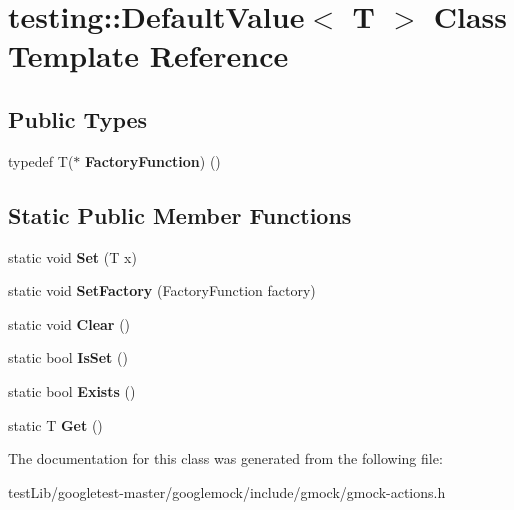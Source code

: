 \hypertarget{classtesting_1_1DefaultValue}{}\section{testing\+:\+:Default\+Value$<$ T $>$ Class Template Reference}
\label{classtesting_1_1DefaultValue}
\subsection*{Public Types}
\begin{DoxyCompactItemize}
\item 
\mbox{\label{classtesting_1_1DefaultValue_a5763a68d75e0a4c97fcaff708e2df803}} 
typedef T($\ast$ {\bfseries Factory\+Function}) ()
\end{DoxyCompactItemize}
\subsection*{Static Public Member Functions}
\begin{DoxyCompactItemize}
\item 
\mbox{\label{classtesting_1_1DefaultValue_a5698814be364b9ac26e72ad37d6ff14e}} 
static void {\bfseries Set} (T x)
\item 
\mbox{\label{classtesting_1_1DefaultValue_af012445ff5b194940c1427529707cb91}} 
static void {\bfseries Set\+Factory} (Factory\+Function factory)
\item 
\mbox{\label{classtesting_1_1DefaultValue_a8163037b60311177cb211f070c512ee3}} 
static void {\bfseries Clear} ()
\item 
\mbox{\label{classtesting_1_1DefaultValue_ad49febe2c944cbbd06451ba7d0366ca1}} 
static bool {\bfseries Is\+Set} ()
\item 
\mbox{\label{classtesting_1_1DefaultValue_aec1ff9b510af7dbb86c837fd2409fd70}} 
static bool {\bfseries Exists} ()
\item 
\mbox{\label{classtesting_1_1DefaultValue_a4dc6dfee4cbc9cdb36f5c9cde5cf2b83}} 
static T {\bfseries Get} ()
\end{DoxyCompactItemize}


The documentation for this class was generated from the following file\+:\begin{DoxyCompactItemize}
\item 
test\+Lib/googletest-\/master/googlemock/include/gmock/gmock-\/actions.\+h\end{DoxyCompactItemize}
